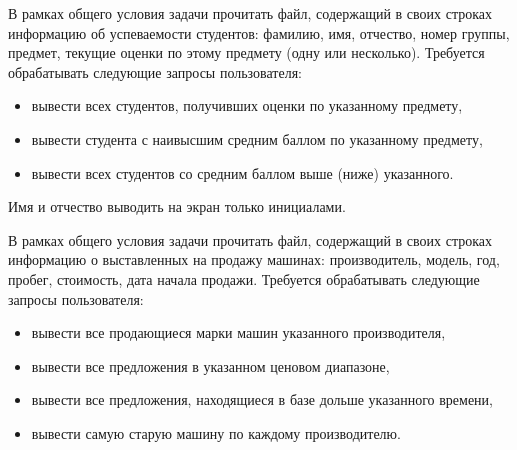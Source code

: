 
\begin{zztask}
В рамках общего условия задачи прочитать файл, содержащий в своих строках
информацию об успеваемости студентов: фамилию, имя, отчество, номер группы,
предмет, текущие оценки по этому предмету (одну или несколько). Требуется
обрабатывать следующие запросы пользователя:
%
\begin{itemize}
\item вывести всех студентов, получивших оценки по указанному предмету,
\item вывести студента с наивысшим средним баллом по указанному предмету,
\item вывести всех студентов со средним баллом выше (ниже) указанного.
\end{itemize}
%
Имя и отчество выводить на экран только инициалами.
\end{zztask}


\begin{zztask}
В рамках общего условия задачи прочитать файл, содержащий в своих строках
информацию о выставленных на продажу машинах: производитель, модель, год,
пробег, стоимость, дата начала продажи. Требуется обрабатывать следующие
запросы пользователя:
%
\begin{itemize}
\item вывести все продающиеся марки машин указанного производителя,
\item вывести все предложения в указанном ценовом диапазоне,
\item вывести все предложения, находящиеся в базе дольше указанного времени,
\item вывести самую старую машину по каждому производителю.
\end{itemize}
\end{zztask}


